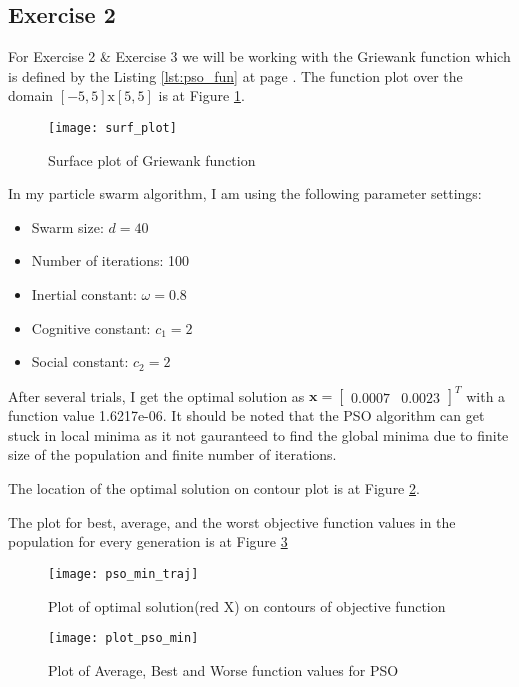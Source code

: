 \documentclass[11pt]{article}
\newcommand{\V}[1]{\pmb{#1}}
\newcommand{\mat}[1]{\begin{bmatrix}#1\end{bmatrix}}
\newcommand{\reflst}[1]{Listing \ref{#1} at page \pageref{#1}}
\newcommand{\reffig}[1]{Figure \ref{#1}}
\begin{document}
%
\newpage
\vspace{2ex}
%
\subsection*{Exercise 2} 

For Exercise 2 \& Exercise 3 we will be working with the Griewank function which is defined by the \reflst{lst:pso_fun}. The function plot over the domain $[-5,5]\text{x}[5,5]$ is at \reffig{fig:pso_fun}.

\begin{figure}[!h]
 \centering
 \texttt{[image: surf\_plot]}
 \caption{Surface plot of Griewank function}
 \label{fig:pso_fun}
\end{figure}

In my particle swarm algorithm, I am using the following parameter settings:
\begin{itemize}
 \item Swarm size: $d=40$
 \item Number of iterations: 100
 \item Inertial constant: $\omega = 0.8$
 \item Cognitive constant: $c_1 = 2$
 \item Social constant: $c_2 = 2$
\end{itemize}
After several trials, I get the optimal solution as $\V{x}=\mat{0.0007 & 0.0023}^T$ with a function value 1.6217e-06. It should be noted that the PSO algorithm can get stuck in local minima as it not gauranteed to find the global minima due to finite size of the population and finite number of iterations.

\noindent The location of the optimal solution on contour plot is at \reffig{fig:pso_min_cont}.

\noindent The plot for best, average, and the worst objective function values in the population for every generation is at \reffig{fig:pso_min}

\begin{figure}[!h]
 \centering
 \texttt{[image: pso\_min\_traj]}
 \caption{Plot of optimal solution(red X) on contours of objective function}
 \label{fig:pso_min_cont}
\end{figure}

\begin{figure}[!h]
 \centering
 \texttt{[image: plot\_pso\_min]}
 \caption{Plot of Average, Best and Worse function values for PSO}
 \label{fig:pso_min}
\end{figure}
\end{document}
